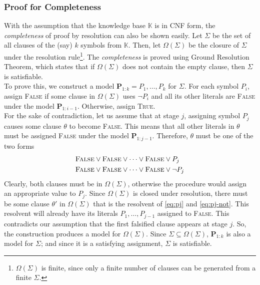 \documentclass[12pt]{article}
\begin{document}
    \subsubsection*{Proof for Completeness}
    With the assumption that the knowledge base $\mathbb{K}$ is in CNF form, the \textit{completeness} of proof by
    resolution can also be shown easily. Let $\Sigma$ be the set of all clauses of the (say) $k$ symbols from $\mathbb{K}$.
    Then, let $\Omega(\Sigma)$ be the closure of $\Sigma$ under the resolution rule\footnote{
        $\Omega(\Sigma)$ is finite, since only a finite number of clauses can be generated from a finite $\Sigma$.
    }. The \textit{completeness} is proved using Ground Resolution Theorem, which states that if $\Omega(\Sigma)$ does not
    contain the empty clause, then $\Sigma$ is satisfiable. \\
    To prove this, we construct a model $\mathbf{P}_{1:k} = P_{1}, \hdots, P_{k}$ for $\Sigma$. For each symbol $P_{i}$,
    assign \textsc{False} if some clause in $\Omega(\Sigma)$ uses $\lnot P_{i}$ and all its other literals are \textsc{False}
    under the model $\mathbf{P}_{1:i-1}$. Otherwise, assign \textsc{True}. \\
    For the sake of contradiction, let us assume that at stage $j$, assigning symbol $P_{j}$ causes some clause $\theta$
    to become \textsc{False}. This means that all other literals in $\theta$ must be assigned \textsc{False} under the
    model $\mathbf{P}_{1:j-1}$. Therefore, $\theta$ must be one of the two forms
    \begin{align}
        \label{eq:pj}
        \textsc{False} &\vee \textsc{False} \vee \cdots \vee \textsc{False} \vee P_{j} \\
        \label{eq:pj-not}
        \textsc{False} &\vee \textsc{False} \vee \cdots \vee \textsc{False} \vee \lnot P_{j}
    \end{align}
    Clearly, both clauses must be in $\Omega(\Sigma)$, otherwise the procedure would assign an appropriate value to $P_{j}$.
    Since $\Omega(\Sigma)$ is closed under resolution, there must be some clause $\theta'$ in $\Omega(\Sigma)$ that is
    the resolvent of \eqref{eq:pj} and \eqref{eq:pj-not}. This resolvent will already have its literals $P_{1}, \hdots, P_{j-1}$
    assigned to \textsc{False}. This contradicts our assumption that the first falsified clause appears at stage $j$. So,
    the construction produces a model for $\Omega(\Sigma)$. Since $\Sigma \subseteq \Omega(\Sigma)$, $\mathbf{P}_{1:k}$ is
    also a model for $\Sigma$; and since it is a satisfying assignment, $\Sigma$ is satisfiable.
\end{document}

